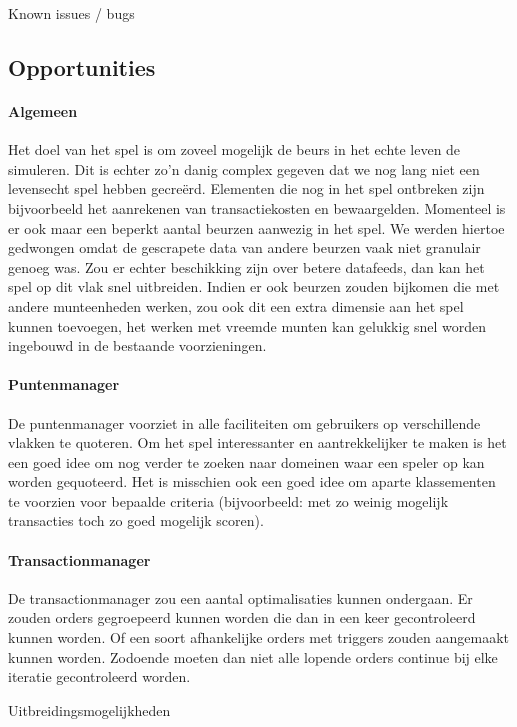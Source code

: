 \todo Known issues / bugs

\subsection{Opportunities}

\paragraph{Algemeen} Het doel van het spel is om zoveel mogelijk de beurs in het echte leven de simuleren. Dit is echter zo'n danig complex gegeven dat we nog lang niet een levensecht spel hebben gecre\"erd. Elementen die nog in het spel ontbreken zijn bijvoorbeeld het aanrekenen van transactiekosten en bewaargelden. 
Momenteel is er ook maar een beperkt aantal beurzen aanwezig in het spel. We werden hiertoe gedwongen omdat de gescrapete data van andere beurzen vaak niet granulair genoeg was. Zou er echter beschikking zijn over betere datafeeds, dan kan het spel op dit vlak snel uitbreiden. Indien er ook beurzen zouden bijkomen die met andere munteenheden werken, zou ook dit een extra dimensie aan het spel kunnen toevoegen, het werken met vreemde munten kan gelukkig snel worden ingebouwd in de bestaande voorzieningen.

\paragraph{Puntenmanager} De puntenmanager voorziet in alle faciliteiten om gebruikers op verschillende vlakken te quoteren. Om het spel interessanter en aantrekkelijker te maken is het een goed idee om nog verder te zoeken naar domeinen waar een speler op kan worden gequoteerd. Het is misschien ook een goed idee om aparte klassementen te voorzien voor bepaalde criteria (bijvoorbeeld: met zo weinig mogelijk transacties toch zo goed mogelijk scoren).

\paragraph{Transactionmanager} De transactionmanager zou een aantal optimalisaties kunnen ondergaan. Er zouden orders gegroepeerd kunnen worden die dan in een keer gecontroleerd kunnen worden. Of een soort afhankelijke orders met triggers zouden aangemaakt kunnen worden. Zodoende moeten dan niet alle lopende orders continue bij elke iteratie gecontroleerd worden.

\todo Uitbreidingsmogelijkheden

